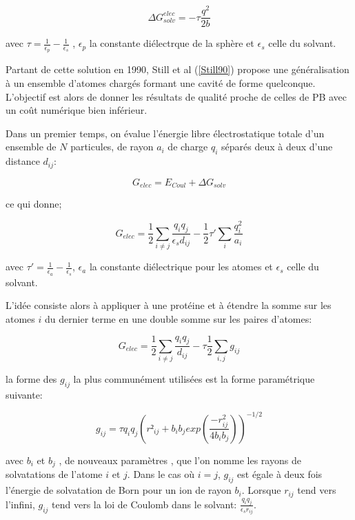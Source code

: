 \begin{equation}
  \label{eq:Born}
  \Delta G_{solv}^{elec} = - \tau \frac{q^2}{2b}
\end{equation}


avec $ \tau = \frac{1}{\epsilon_p} - \frac{1}{\epsilon_s}$ , $\epsilon_p$ la constante diélectrque de la sphère et $\epsilon_s$ celle du solvant.

Partant de cette solution en 1990, Still et al (\ref{Still90}) propose une généralisation à un ensemble d'atomes chargés formant une cavité de forme quelconque. L'objectif est alors de donner les résultats de qualité proche de celles de PB avec un coût numérique bien inférieur.

Dans un premier temps, on évalue l'énergie libre électrostatique totale d'un ensemble de $N$ particules, de rayon $a_i$ de charge $q_i$ séparés deux à deux d'une distance $d_{ij}$:


\begin{equation}
  \label{eq:GB}
  G_{elec} =  E_{Coul} + \Delta G_{solv}
\end{equation}

ce qui donne;

\begin{equation}
  \label{eq:GB}
 G_{elec} =  \frac{1}{2}  \sum_{i \neq j} \frac{q_iq_j}{\epsilon_s d_{ij}}- \frac{1}{2}  \tau' \sum_i\frac{q_i^2}{a_i}
\end{equation}

avec $ \tau' = \frac{1}{\epsilon_a} - \frac{1}{\epsilon_s}$, $\epsilon_a$ la constante diélectrique pour les atomes et $ \epsilon_s$ celle du solvant.


L'idée consiste alors à appliquer   \label{eq:GB} à une protéine et à étendre la somme sur les atomes $i$ du dernier terme en une double somme sur les paires d'atomes:

\begin{equation}
  G_{elec} = \frac{1}{2} \sum_{i \neq j} \frac{q_iq_j}{d_{ij}} - \tau \frac{1}{2} \sum_{i,j} g_{ij}
\end{equation}

la forme des $g_{ij}$ la plus communément utilisées est la forme paramétrique suivante:


\begin{equation}
  \label{eq:GBg}
  g_{ij}= \tau q_iq_j (r²_{ij} + b_ib_j exp(\frac{-r^2_{ij}}{4b_ib_j}))^{-1/2} 
\end{equation}

avec $b_i$ et $b_j$  , de nouveaux paramètres , que l'on nomme les rayons de solvatations de l'atome $i$ et $j$.
Dans le cas où $i=j$, $g_{ij}$ est égale à deux fois l'énergie de solvatation de Born pour un ion de rayon $b_i$.
Lorsque $r_{ij}$ tend vers l'infini, $g_{ij}$ tend vers la loi de Coulomb dans le solvant: $\frac{q_iq_j}{\epsilon_s r_{ij}}$.


